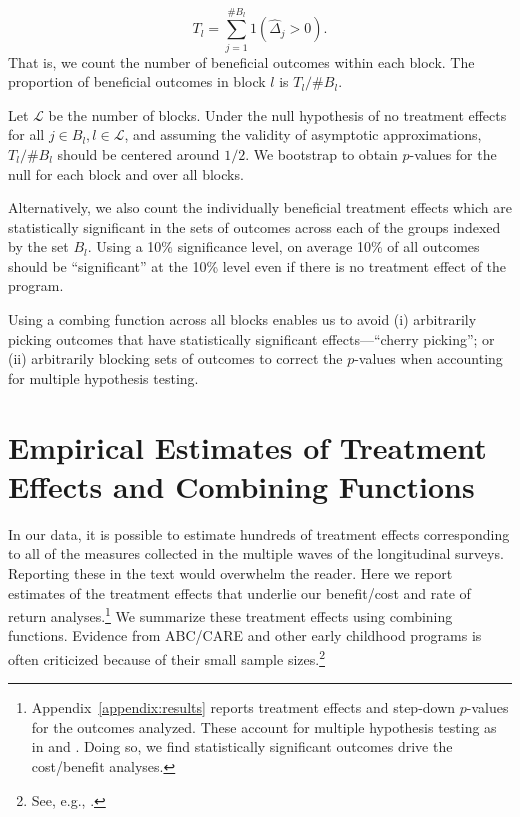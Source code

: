 \begin{equation}
T_l = \displaystyle\sum^{\# B_l}_{j=1} 1 (\hat{\Delta}_j >0).
\end{equation}
That is, we count the number of beneficial outcomes within each block. The proportion of beneficial outcomes in block $l$ is $T_l / \# B_l$.

Let $\mathcal{L}$ be the number of blocks. Under the null hypothesis of no treatment effects for all $j \in B_l, l \in \mathcal{L}$, and assuming the validity of asymptotic approximations, $T_l / \# B_l$ should be centered around $1/2$. We bootstrap to obtain $p$-values for the null for each block and over all blocks.

Alternatively, we also count the individually beneficial treatment effects which are statistically significant in the sets of outcomes across each of the groups indexed by the set $B_l$. Using a 10\% significance level, on average 10\% of all outcomes should be ``significant'' at the 10\% level even if there is no treatment effect of the program.

Using a combing function across all blocks enables us to avoid (i) arbitrarily picking outcomes that have statistically significant effects---``cherry picking''; or (ii) arbitrarily blocking sets of outcomes to correct the $p$-values when accounting for multiple hypothesis testing.

\section{Empirical Estimates of Treatment Effects and Combining Functions}\label{section:c-functions}

In our data, it is possible to estimate hundreds of treatment effects corresponding to all of the measures collected in the multiple waves of the longitudinal surveys. Reporting these in the text would overwhelm the reader. Here we report estimates of the treatment effects that underlie our benefit/cost and rate of return analyses.\footnote{Appendix~\ref{appendix:results} reports treatment effects and step-down  $p$-values for the outcomes analyzed. These account for multiple hypothesis testing as in \citet{Lehman_Romano_2005_AnnStat} and \citet{Romano_Shaikh_2006_AnnStat}. Doing so, we find statistically significant outcomes drive the cost/benefit analyses.} We summarize these treatment effects using combining functions. Evidence from ABC/CARE and other early childhood programs is often criticized because of their small sample sizes.\footnote{See, e.g., \cite{Murray_2013_GivingKids_JJHBOOK}.}

